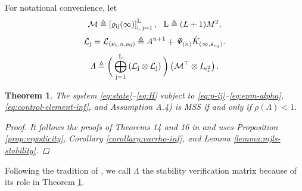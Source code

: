 \documentclass[journal,twoside,web]{ieeecolor}
\newtheorem{theorem}{Theorem}
\begin{document}
For notational convenience, let 
\begin{equation}\label{eq:mathcalM}
    \text{\small $\mathcal{M} \triangleq \left[ \varrho_{{\mathrm{i}\mathrm{j}}}(\infty)\right]_{\mathrm{i},\,\mathrm{j}=1}^{\mathrm{L}},~~
    \mathrm{L}\triangleq (L+1)M^2,$}
\end{equation}
\begin{equation}\label{eq:mathcalL}
    \text{\small $\mathcal{L}_{\mathrm{j}} = \mathcal{L}_{({\nu_1},n,{\nu_0})} \triangleq A^{n+1} + \mathit{\Psi}_{(n)} \hat{K}_{(\infty,\hat{s}_{\nu_0})}.$}
\end{equation}
\begin{equation}\label{eq:Lambda}
\text{\small $\mathit{\Lambda} \triangleq \bigg( \bigoplus_{\mathrm{j}=1}^{\mathrm{L}} 
    \left( \mathcal{L}_{\mathrm{j}} \otimes \mathcal{L}_{\mathrm{j}} \right)\bigg)
    \left( \mathcal{M}^{\top} \otimes I_{n_x^2} \right).$} %
\end{equation}
\begin{theorem}\label{theorem:stability}
    The system \eqref{eq:state}–\eqref{eq:H} subject to \eqref{eq:p-ij}–\eqref{eq:epm-alpha}, \eqref{eq:control-element-inf}, and Assumption A.4) is MSS if and only if $\rho\left(\mathit{\Lambda}\right)<1$.

    \begin{proof}
        It follows the proofs of Theorems 14 and 16 in \cite{yZL-2025-automatica} and uses Proposition \ref{prop:ergodicity}, Corollary \ref{corollary:varrho-inf}, and Lemma \ref{lemma:mjls-stability}.
    \end{proof}
\end{theorem}
Following the tradition of \cite{yZL-2025-automatica}, we call $\mathit{\Lambda}$ the stability verification matrix because of its role in Theorem \ref{theorem:stability}.
\end{document}
